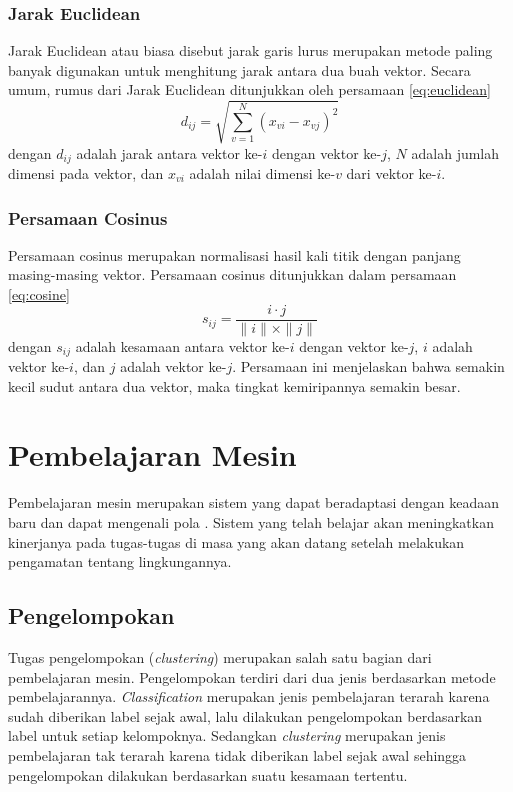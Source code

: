 \subsubsection{Jarak Euclidean}
\label{sub:euclideanDist}
Jarak Euclidean atau biasa disebut jarak garis lurus merupakan metode paling banyak digunakan untuk menghitung jarak antara dua buah vektor. Secara umum, rumus dari Jarak Euclidean ditunjukkan oleh persamaan \ref{eq:euclidean}
\begin{equation}
\label{eq:euclidean}
d_{ij}=\sqrt{\sum_{v=1}^N (x_{vi}-x_{vj})^2}
\end{equation}
dengan $d_{ij}$ adalah jarak antara vektor ke-$i$ dengan vektor ke-$j$, $N$ adalah jumlah dimensi pada vektor, dan $x_{vi}$ adalah nilai dimensi ke-$v$ dari vektor ke-$i$.

\subsubsection{Persamaan Cosinus}
\label{sub:cosineDist}
Persamaan cosinus merupakan normalisasi hasil kali titik dengan panjang masing-masing vektor. Persamaan cosinus ditunjukkan dalam persamaan \ref{eq:cosine}
\begin{equation}
\label{eq:cosine}
s_{ij}=\frac{i\cdot j}{\parallel i \parallel \times \parallel j \parallel}
\end{equation}
dengan $s_{ij}$ adalah kesamaan antara vektor ke-$i$ dengan vektor ke-$j$, $i$ adalah vektor ke-$i$, dan $j$ adalah vektor ke-$j$. Persamaan ini menjelaskan bahwa semakin kecil sudut antara dua vektor, maka tingkat kemiripannya semakin besar.

\section{Pembelajaran Mesin}
Pembelajaran mesin merupakan sistem yang dapat beradaptasi dengan keadaan baru dan dapat mengenali pola \cite{russell2016artificial}. Sistem yang telah belajar akan meningkatkan kinerjanya pada tugas-tugas di masa yang akan datang setelah melakukan pengamatan tentang lingkungannya. 

\subsection{Pengelompokan}
Tugas pengelompokan (\textit{clustering}) merupakan salah satu bagian dari pembelajaran mesin. Pengelompokan terdiri dari dua jenis berdasarkan metode pembelajarannya. \textit{Classification} merupakan jenis pembelajaran terarah karena sudah diberikan label sejak awal, lalu dilakukan pengelompokan berdasarkan label untuk setiap kelompoknya. Sedangkan \textit{clustering} merupakan jenis pembelajaran tak terarah karena tidak diberikan label sejak awal sehingga pengelompokan dilakukan berdasarkan suatu kesamaan tertentu.

